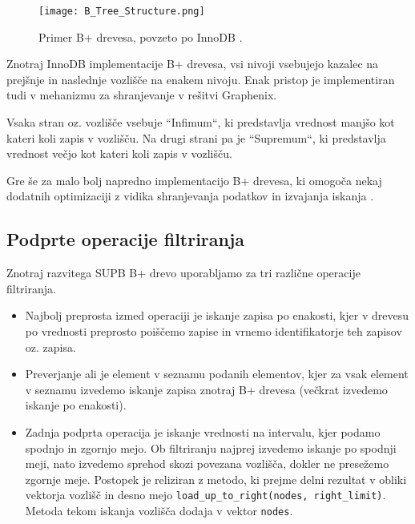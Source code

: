 \documentclass[a4paper,12pt,openright]{book}
\begin{document}
        \begin{figure}[H]
            \centerline{\texttt{[image: B\_Tree\_Structure.png]}}
            \caption{Primer B+ drevesa, povzeto po InnoDB \cite{BPTREE_INNODB}.}
            \label{btree_innodb}
        \end{figure}

        \noindent
        Znotraj InnoDB implementacije B+ drevesa, vsi nivoji vsebujejo kazalec na prejšnje in naslednje vozlišče na enakem nivoju. Enak pristop je implementiran tudi v mehanizmu za shranjevanje v rešitvi Graphenix. 
        
        Vsaka stran oz. vozlišče vsebuje ``Infimum``, ki predstavlja vrednost manjšo kot kateri koli zapis v vozlišču. Na drugi strani pa je ``Supremum``, ki predstavlja vrednost večjo kot kateri koli zapis v vozlišču.

        Gre še za malo bolj napredno implementacijo B+ drevesa, ki omogoča nekaj dodatnih optimizaciji z vidika shranjevanja podatkov in izvajanja iskanja \cite{BPTREE_INNODB}.
        
        \subsection{Podprte operacije filtriranja}
        
        Znotraj razvitega SUPB B+ drevo uporabljamo za tri različne operacije filtriranja.
        \begin{itemize}
            \item Najbolj preprosta izmed operaciji je iskanje zapisa po enakosti, kjer v drevesu po vrednosti preprosto poiščemo zapise in vrnemo identifikatorje teh zapisov oz. zapisa.
            \item Preverjanje ali je element v seznamu podanih elementov, kjer za vsak element v seznamu izvedemo iskanje zapisa znotraj B+ drevesa (večkrat izvedemo iskanje po enakosti).
            \item Zadnja podprta operacija je iskanje vrednosti na intervalu, kjer podamo spodnjo in zgornjo mejo. Ob filtriranju najprej izvedemo iskanje po spodnji meji, nato izvedemo sprehod skozi povezana vozlišča, dokler ne presežemo zgornje meje. Postopek je reliziran z metodo, ki prejme delni rezultat v obliki vektorja vozlišč in desno mejo {\tt load\_up\_to\_right(nodes, right\_limit)}. Metoda tekom iskanja vozlišča dodaja v vektor {\tt nodes}.
        \end{itemize}
\end{document}
